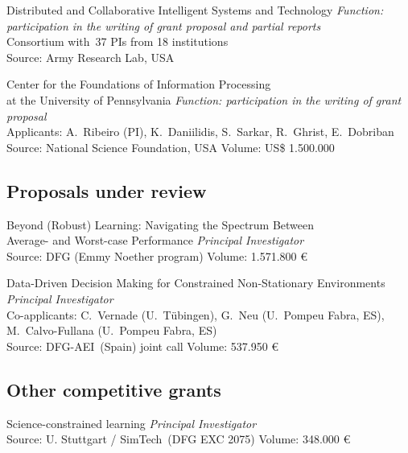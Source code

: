 \documentclass{cvlfoc}
\begin{document}
{\begin{entrydate}
		{Distributed and Collaborative Intelligent Systems and Technology}
		{}
		{\emph{Function: participation in the writing of grant proposal and partial reports}\\
		Consortium with~37 PIs from 18 institutions\\
		Source: Army Research Lab, USA}

		{Center for the Foundations of Information Processing\\at the University of Pennsylvania}
		{}
		{\emph{Function: participation in the writing of grant proposal}\\
		Applicants: A.\ Ribeiro (PI), K.\ Daniilidis, S.\ Sarkar, R.\ Ghrist, E.\ Dobriban\\
		Source: National Science Foundation, USA \hfill Volume: US\$ 1.500.000}
\end{entrydate}


\subsection*{Proposals under review}

\begin{entrydate}
	\entrydetail{}
		{Beyond (Robust) Learning: Navigating the Spectrum Between\\Average- and Worst-case Performance}
		{}
		{\emph{Principal Investigator}\\
		Source: DFG (Emmy Noether program) \hfill Volume: 1.571.800 \euro}

	\entrydetail{}
		{Data-Driven Decision Making for Constrained Non-Stationary Environments}
		{}
		{\emph{Principal Investigator}\\
		Co-applicants: C.\ Vernade (U.\ T\"{u}bingen), G.\ Neu (U.\ Pompeu Fabra, ES),\\
		M.\ Calvo-Fullana (U.\ Pompeu Fabra, ES)\\
		Source: DFG-AEI~(Spain) joint call \hfill Volume: 537.950 \euro}
\end{entrydate}


\subsection*{Other competitive grants}

\begin{entrydate}
		{Science-constrained learning}
		{}
		{\emph{Principal Investigator}\\
		Source: U. Stuttgart / SimTech~(DFG EXC 2075) \hfill Volume: 348.000 \euro}
\end{entrydate}
}{}
\end{document}
